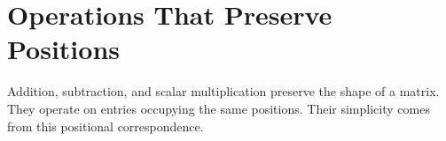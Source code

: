\section{Operations That Preserve Positions}

\begin{corebox}
Addition, subtraction, and scalar multiplication preserve the shape of a matrix.
They operate on entries occupying the same positions. Their simplicity comes
from this positional correspondence.
\end{corebox}


